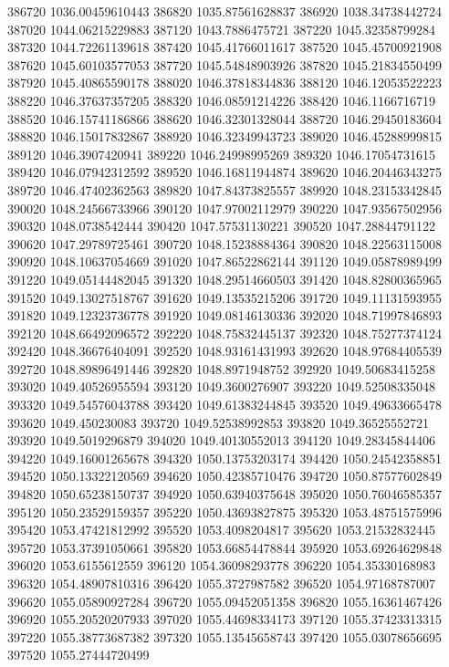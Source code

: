 {386720 1036.00459610443
386820 1035.87561628837
386920 1038.34738442724
387020 1044.06215229883
387120 1043.7886475721
387220 1045.32358799284
387320 1044.72261139618
387420 1045.41766011617
387520 1045.45700921908
387620 1045.60103577053
387720 1045.54848903926
387820 1045.21834550499
387920 1045.40865590178
388020 1046.37818344836
388120 1046.12053522223
388220 1046.37637357205
388320 1046.08591214226
388420 1046.1166716719
388520 1046.15741186866
388620 1046.32301328044
388720 1046.29450183604
388820 1046.15017832867
388920 1046.32349943723
389020 1046.45288999815
389120 1046.3907420941
389220 1046.24998995269
389320 1046.17054731615
389420 1046.07942312592
389520 1046.16811944874
389620 1046.20446343275
389720 1046.47402362563
389820 1047.84373825557
389920 1048.23153342845
390020 1048.24566733966
390120 1047.97002112979
390220 1047.93567502956
390320 1048.0738542444
390420 1047.57531130221
390520 1047.28844791122
390620 1047.29789725461
390720 1048.15238884364
390820 1048.22563115008
390920 1048.10637054669
391020 1047.86522862144
391120 1049.05878989499
391220 1049.05144482045
391320 1048.29514660503
391420 1048.82800365965
391520 1049.13027518767
391620 1049.13535215206
391720 1049.11131593955
391820 1049.12323736778
391920 1049.08146130336
392020 1048.71997846893
392120 1048.66492096572
392220 1048.75832445137
392320 1048.75277374124
392420 1048.36676404091
392520 1048.93161431993
392620 1048.97684405539
392720 1048.89896491446
392820 1048.8971948752
392920 1049.50683415258
393020 1049.40526955594
393120 1049.3600276907
393220 1049.52508335048
393320 1049.54576043788
393420 1049.61383244845
393520 1049.49633665478
393620 1049.450230083
393720 1049.52538992853
393820 1049.36525552721
393920 1049.5019296879
394020 1049.40130552013
394120 1049.28345844406
394220 1049.16001265678
394320 1050.13753203174
394420 1050.24542358851
394520 1050.13322120569
394620 1050.42385710476
394720 1050.87577602849
394820 1050.65238150737
394920 1050.63940375648
395020 1050.76046585357
395120 1050.23529159357
395220 1050.43693827875
395320 1053.48751575996
395420 1053.47421812992
395520 1053.4098204817
395620 1053.21532832445
395720 1053.37391050661
395820 1053.66854478844
395920 1053.69264629848
396020 1053.6155612559
396120 1054.36098293778
396220 1054.35330168983
396320 1054.48907810316
396420 1055.3727987582
396520 1054.97168787007
396620 1055.05890927284
396720 1055.09452051358
396820 1055.16361467426
396920 1055.20520207933
397020 1055.44698334173
397120 1055.37423313315
397220 1055.38773687382
397320 1055.13545658743
397420 1055.03078656695
397520 1055.27444720499
}
